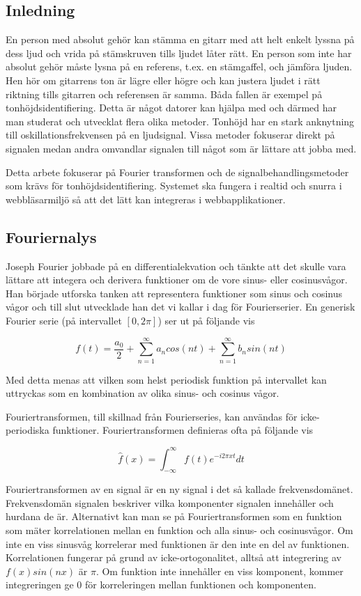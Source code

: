 \subsection*{Inledning}
En person med absolut gehör kan stämma en gitarr med att helt enkelt lyssna på dess ljud och vrida på stämskruven tills ljudet låter rätt. En person som inte har absolut gehör måste lysna på en referens, t.ex. en stämgaffel, och jämföra ljuden. Hen hör om gitarrens ton är lägre eller högre och kan justera ljudet i rätt riktning tills gitarren och referensen är samma. Båda fallen är exempel på tonhöjdsidentifiering. Detta är något datorer kan hjälpa med och därmed har man studerat och utvecklat flera olika metoder. Tonhöjd har en stark anknytning till oskillationsfrekvensen på en ljudsignal. Vissa metoder fokuserar direkt på signalen medan andra omvandlar signalen till något som är lättare att jobba med.

Detta arbete fokuserar på Fourier transformen och de signalbehandlingsmetoder som krävs för tonhöjdsidentifiering. Systemet ska fungera i realtid och snurra i webbläsarmiljö så att det lätt kan integreras i webbapplikationer.

\subsection*{Fouriernalys}
Joseph Fourier jobbade på en differentialekvation och tänkte att det skulle vara lättare att integera och derivera funktioner om de vore sinus- eller cosinusvågor. Han började utforska tanken att representera funktioner som sinus och cosinus vågor och till slut utvecklade han det vi kallar i dag för Fourierserier. En generisk Fourier serie (på intervallet $[0, 2\pi]$) ser ut på följande vis

$$f(t) = \frac{a_0}{2} + \sum_{n=1}^{\infty}a_ncos(nt)+\sum_{n=1}^{\infty}b_nsin(nt)$$

Med detta menas att vilken som helst periodisk funktion på intervallet kan uttryckas som en kombination av olika sinus- och cosinus vågor. 

Fouriertransformen, till skillnad från Fourierseries, kan användas för icke-periodiska funktioner. Fouriertransformen definieras ofta på följande vis

$$\hat{f}(x) = \int_{-\infty}^{\infty} f(t)e^{-i2\pi x t} dt$$

Fouriertransformen av en signal är en ny signal i det så kallade frekvensdomänet. Frekvensdomän signalen beskriver vilka komponenter signalen innehåller och hurdana de är. Alternativt kan man se på Fouriertransformen som en funktion som mäter korrelationen mellan en funktion och alla sinus- och cosinusvågor. Om inte en viss sinusvåg korrelerar med funktionen
är den inte en del av funktionen. Korrelationen fungerar på grund av icke-ortogonalitet, alltså att integrering av $f(x)sin(nx)$ är $\pi$. Om funktion inte innehåller en viss komponent, kommer integreringen ge $0$ för korreleringen mellan funktionen och komponenten.

